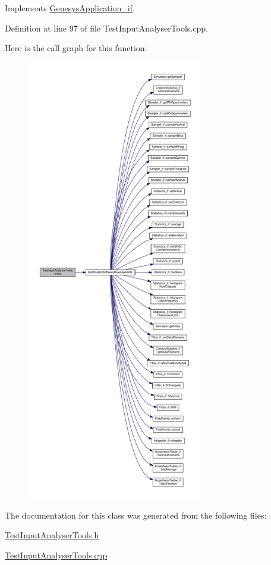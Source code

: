 Implements \hyperlink{class_genesys_application__if_a2b07e7803b410a4a8d0f87422dabb004}{Genesys\-Application\-\_\-if}.



Definition at line 97 of file Test\-Input\-Analyser\-Tools.\-cpp.



Here is the call graph for this function\-:
\nopagebreak
\begin{figure}[H]
\begin{center}
\leavevmode
\includegraphics[height=550pt]{class_test_input_analyser_tools_a8015a3024f29bddc865cb0b419214cd7_cgraph}
\end{center}
\end{figure}




The documentation for this class was generated from the following files\-:\begin{DoxyCompactItemize}
\item 
\hyperlink{_test_input_analyser_tools_8h}{Test\-Input\-Analyser\-Tools.\-h}\item 
\hyperlink{_test_input_analyser_tools_8cpp}{Test\-Input\-Analyser\-Tools.\-cpp}\end{DoxyCompactItemize}
